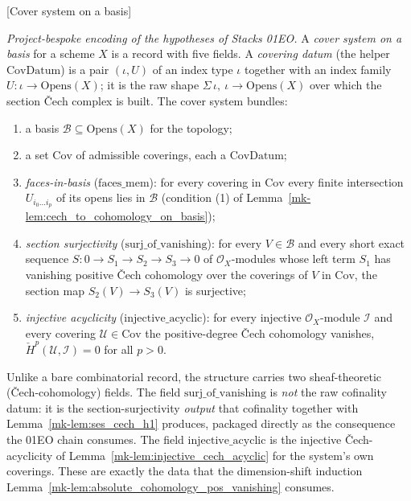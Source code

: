 \begin{definition}

[Cover system on a basis]
  \label{mk-def:basis_cov_system}

  \textit{Project-bespoke encoding of the hypotheses of Stacks 01EO.}
  A \emph{cover system on a basis} for a scheme \(X\) is a record with five fields. A
  \emph{covering datum} (the helper \(\mathrm{CovDatum}\)) is a pair \((\iota, U)\) of an index type
  \(\iota\) together with an index family \(U : \iota \to \mathrm{Opens}(X)\); it is the raw shape
  \(\Sigma\,\iota,\ \iota \to \mathrm{Opens}(X)\) over which the section {\v C}ech complex is built.
  The cover system bundles:
  \begin{enumerate}
  \item a basis \(\mathcal{B} \subseteq \mathrm{Opens}(X)\) for the topology;
  \item a set \(\mathrm{Cov}\) of admissible coverings, each a \(\mathrm{CovDatum}\);
  \item \emph{faces-in-basis} (\(\mathrm{faces\_mem}\)): for every covering in \(\mathrm{Cov}\) every
    finite intersection \(U_{i_0 \ldots i_p}\) of its opens lies in \(\mathcal{B}\) (condition (1) of
    Lemma~\ref{mk-lem:cech_to_cohomology_on_basis});
  \item \emph{section surjectivity} (\(\mathrm{surj\_of\_vanishing}\)): for every \(V \in \mathcal{B}\)
    and every short exact sequence \(S : 0 \to S_1 \to S_2 \to S_3 \to 0\) of \(\mathcal{O}_X\)-modules
    whose left term \(S_1\) has vanishing positive {\v C}ech cohomology over the coverings of \(V\) in
    \(\mathrm{Cov}\), the section map \(S_2(V) \to S_3(V)\) is surjective;
  \item \emph{injective acyclicity} (\(\mathrm{injective\_acyclic}\)): for every injective
    \(\mathcal{O}_X\)-module \(\mathcal{I}\) and every covering \(\mathcal{U} \in \mathrm{Cov}\) the
    positive-degree {\v C}ech cohomology vanishes, \(\check{H}^p(\mathcal{U}, \mathcal{I}) = 0\) for
    all \(p > 0\).
  \end{enumerate}
  Unlike a bare combinatorial record, the structure carries two sheaf-theoretic ({\v C}ech-cohomology)
  fields. The field \(\mathrm{surj\_of\_vanishing}\) is \emph{not} the raw cofinality datum: it is the
  section-surjectivity \emph{output} that cofinality together with Lemma~\ref{mk-lem:ses_cech_h1}
  produces, packaged directly as the consequence the 01EO chain consumes. The field
  \(\mathrm{injective\_acyclic}\) is the injective {\v C}ech-acyclicity of
  Lemma~\ref{mk-lem:injective_cech_acyclic} for the system's own coverings. These are exactly the data
  that the dimension-shift induction Lemma~\ref{mk-lem:absolute_cohomology_pos_vanishing} consumes.
\end{definition}


